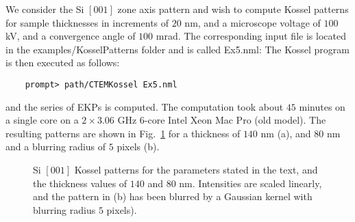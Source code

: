 \documentclass[DIV=calc, paper=letter, fontsize=11pt]{scrartcl}	 %
\begin{document}
We consider the Si $[001]$ zone axis pattern and wish to compute Kossel patterns for sample thicknesses in increments of $20$ nm,
and a microscope voltage of $100$ kV, and a convergence angle of $100$ mrad. The corresponding input file is located in the 
\textsf{examples/KosselPatterns} folder and is called \textsf{Ex5.nml}:
The Kossel program is then executed as follows:
\begin{verbatim}
	prompt> path/CTEMKossel Ex5.nml
\end{verbatim}
and the series of EKPs is computed.  The computation took about $45$ minutes on a single core on a $2\times 3.06$ GHz 6-core Intel Xeon Mac Pro (old model).
The resulting patterns are shown in Fig.~\ref{fig:ex1} for a thickness of $140$ nm (a), and $80$ nm and a blurring radius of $5$ pixels (b).


\begin{figure}[h]
\leavevmode\centering
\epsfxsize=6in
\caption{\label{fig:ex1}Si $[001]$ Kossel patterns for the parameters stated in the text, and the thickness values of $140$ and $80$ nm.  Intensities are 
scaled linearly, and the pattern in (b) has been blurred by a Gaussian kernel with blurring radius $5$ pixels).}
\end{figure}
\end{document}

